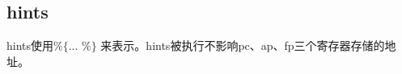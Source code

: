 \subsection{hints}\label{subsec: processor-hints}
hints使用$\texttt{\%\{ ... \%\}}$ 来表示。hints被执行不影响pc、ap、fp三个寄存器存储的地址。